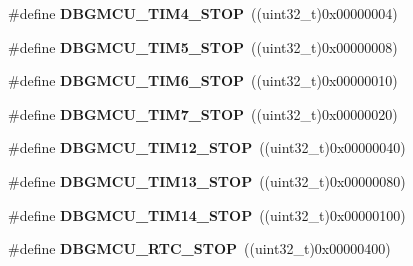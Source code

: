 \begin{DoxyCompactItemize}
\item 
\hypertarget{group___d_b_g_m_c_u___exported___constants_gac87363a4018e2b23a907cfaf836494f1}{}\#define {\bfseries D\+B\+G\+M\+C\+U\+\_\+\+T\+I\+M4\+\_\+\+S\+T\+O\+P}~((uint32\+\_\+t)0x00000004)\label{group___d_b_g_m_c_u___exported___constants_gac87363a4018e2b23a907cfaf836494f1}

\item 
\hypertarget{group___d_b_g_m_c_u___exported___constants_gaf97e21534b3aa9482af496497a37ff4b}{}\#define {\bfseries D\+B\+G\+M\+C\+U\+\_\+\+T\+I\+M5\+\_\+\+S\+T\+O\+P}~((uint32\+\_\+t)0x00000008)\label{group___d_b_g_m_c_u___exported___constants_gaf97e21534b3aa9482af496497a37ff4b}

\item 
\hypertarget{group___d_b_g_m_c_u___exported___constants_ga076cf7d18c7019e99f5f15962ab317eb}{}\#define {\bfseries D\+B\+G\+M\+C\+U\+\_\+\+T\+I\+M6\+\_\+\+S\+T\+O\+P}~((uint32\+\_\+t)0x00000010)\label{group___d_b_g_m_c_u___exported___constants_ga076cf7d18c7019e99f5f15962ab317eb}

\item 
\hypertarget{group___d_b_g_m_c_u___exported___constants_gaf593ca16ee6d3f1fabc549878f3f87f0}{}\#define {\bfseries D\+B\+G\+M\+C\+U\+\_\+\+T\+I\+M7\+\_\+\+S\+T\+O\+P}~((uint32\+\_\+t)0x00000020)\label{group___d_b_g_m_c_u___exported___constants_gaf593ca16ee6d3f1fabc549878f3f87f0}

\item 
\hypertarget{group___d_b_g_m_c_u___exported___constants_ga4814287cef24f57e795b0f5b0174b49c}{}\#define {\bfseries D\+B\+G\+M\+C\+U\+\_\+\+T\+I\+M12\+\_\+\+S\+T\+O\+P}~((uint32\+\_\+t)0x00000040)\label{group___d_b_g_m_c_u___exported___constants_ga4814287cef24f57e795b0f5b0174b49c}

\item 
\hypertarget{group___d_b_g_m_c_u___exported___constants_gae0dd8a28977b261b013fa1ecda79b289}{}\#define {\bfseries D\+B\+G\+M\+C\+U\+\_\+\+T\+I\+M13\+\_\+\+S\+T\+O\+P}~((uint32\+\_\+t)0x00000080)\label{group___d_b_g_m_c_u___exported___constants_gae0dd8a28977b261b013fa1ecda79b289}

\item 
\hypertarget{group___d_b_g_m_c_u___exported___constants_ga731f63d66045abee68dbc634070df051}{}\#define {\bfseries D\+B\+G\+M\+C\+U\+\_\+\+T\+I\+M14\+\_\+\+S\+T\+O\+P}~((uint32\+\_\+t)0x00000100)\label{group___d_b_g_m_c_u___exported___constants_ga731f63d66045abee68dbc634070df051}

\item 
\hypertarget{group___d_b_g_m_c_u___exported___constants_gaa0da3d959bc74550ea6a02534768074f}{}\#define {\bfseries D\+B\+G\+M\+C\+U\+\_\+\+R\+T\+C\+\_\+\+S\+T\+O\+P}~((uint32\+\_\+t)0x00000400)\label{group___d_b_g_m_c_u___exported___constants_gaa0da3d959bc74550ea6a02534768074f}


\end{DoxyCompactItemize}

